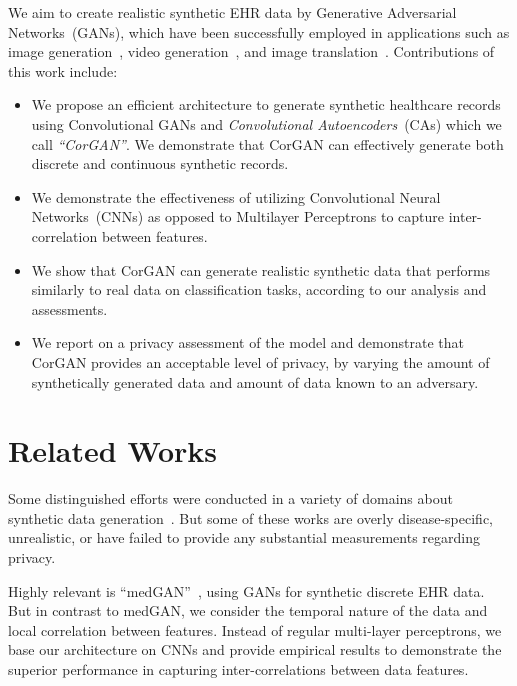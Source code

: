 \documentclass[letterpaper]{article} \usepackage{aaai20}  \usepackage{times}  \usepackage{helvet} \usepackage{courier}  \usepackage[hyphens]{url}  \usepackage{graphicx} \urlstyle{rm} \def\UrlFont{\rm}  \usepackage{graphicx}  \frenchspacing  \setlength{\pdfpagewidth}{8.5in}  \setlength{\pdfpageheight}{11in}
\begin{document}
We aim to create realistic synthetic EHR data by Generative Adversarial Networks~(GANs), which have been successfully employed in applications such as image generation~\cite{reed2016generative,brock2018large,karras2018style}, video generation~\cite{vondrick2016generating,tulyakov2018mocogan}, and image translation~\cite{isola2017image,kim2017learning,dong2017unsupervised}.
Contributions of this work include:

\begin{itemize}
    \item We propose an efficient architecture to generate synthetic healthcare records using Convolutional GANs and \textit{Convolutional Autoencoders}~(CAs) which we call \textit{``CorGAN''}. We demonstrate that CorGAN can effectively generate both discrete and continuous synthetic records.
    \item We demonstrate the effectiveness of utilizing Convolutional Neural Networks~(CNNs) as opposed to Multilayer Perceptrons to capture inter-correlation between features.
    \item We show that CorGAN can generate realistic synthetic data that performs similarly to real data on classification tasks, according to  our analysis and assessments.
    \item We report on a privacy assessment of the model and demonstrate that CorGAN provides an acceptable level of privacy, by varying the amount of synthetically generated data and amount of data known to an adversary.
\end{itemize}

\section{Related Works}\label{sec:RelatedWorks}

Some distinguished efforts were conducted in a variety of domains about synthetic data generation~\cite{walonoski2017synthea,buczak2010data,mclachlan2016using,park2013perturbed}.
But some of these works are overly disease-specific, unrealistic, or have failed to provide any substantial measurements regarding privacy.

Highly relevant is ``medGAN''~\cite{choi2017generating}, using GANs for synthetic discrete EHR data.
But in contrast to medGAN, we consider the temporal nature of the data and local correlation between features.
Instead of regular multi-layer perceptrons, we base our architecture on CNNs and provide empirical results to demonstrate the superior performance in capturing inter-correlations between data features.
\end{document}
